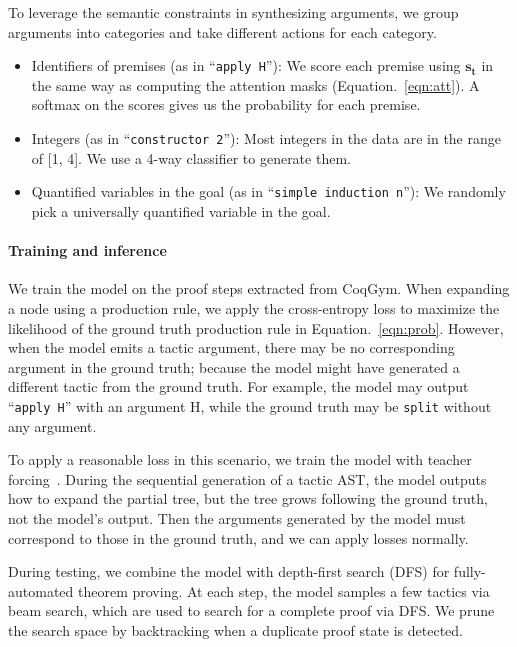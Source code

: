 \documentclass{article}
\newcommand{\smallsec}[1]{\vspace{-3mm} \paragraph{#1}}
\newcommand{\datasetname}{CoqGym}
\begin{document}
To leverage the semantic constraints in synthesizing arguments, we group arguments into categories and take different actions for each category.



\begin{itemize}

\item Identifiers of premises (as in ``\texttt{apply H}''): We score each premise using $\mathbf{s_t}$ in the same way as computing the attention masks (Equation.~\ref{eqn:att}).
A softmax on the scores gives us the probability for each premise.



\item Integers (as in ``\texttt{constructor 2}''): Most integers in the data are in the range of [1, 4]. 
We use a 4-way classifier to generate them.


\item Quantified variables in the goal (as in ``\texttt{simple induction n}''): We randomly pick a universally quantified variable in the goal.


\end{itemize}


\smallsec{Training and inference}
We train the model on the proof steps extracted from \datasetname.
When expanding a node using a production rule, we apply the cross-entropy loss to maximize the likelihood of the ground truth production rule in Equation.~\ref{eqn:prob}.
However, when the model emits a tactic argument, there may be no corresponding argument in the ground truth;
because the model might have generated a different tactic from the ground truth.
For example, the model may output ``\texttt{apply H}'' with an argument H, while the ground truth may be \texttt{split} without any argument.

To apply a reasonable loss in this scenario, we train the model with teacher forcing~\cite{williams1989learning}.
During the sequential generation of a tactic AST, the model outputs how to expand the partial tree, but the tree grows following the ground truth, not the model's output. 
Then the arguments generated by the model must correspond to those in the ground truth,
and we can apply losses normally.

During testing, we combine the model with depth-first search (DFS) for fully-automated theorem proving.
At each step, the model samples a few tactics via beam search, which are used to search for a complete proof via DFS. We prune the search space by backtracking when a duplicate proof state is detected.
\end{document}
